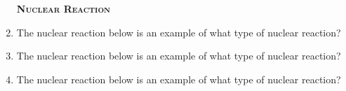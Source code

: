 \documentclass[main.tex]{subfiles}
\begin{document}
\begin{multicols*}{2}
\begin{enumerate}
{\raggedright\textsc{\textbf{Nuclear Reaction }}\par}

\item The nuclear reaction below is an example of what type of nuclear reaction? \\
\begin{center}
\end{center}
\begin{enumerate}[label=(\alph*)]
\end{enumerate}

\item The nuclear reaction below is an example of what type of nuclear reaction? \\
\begin{center} \end{center}
\begin{enumerate}[label=(\alph*)]
\end{enumerate}


\item The nuclear reaction below is an example of what type of nuclear reaction? \\
\begin{center} \end{center}
\begin{enumerate}[label=(\alph*)]
\end{enumerate}


\end{enumerate}
\end{multicols*}
\end{document}
